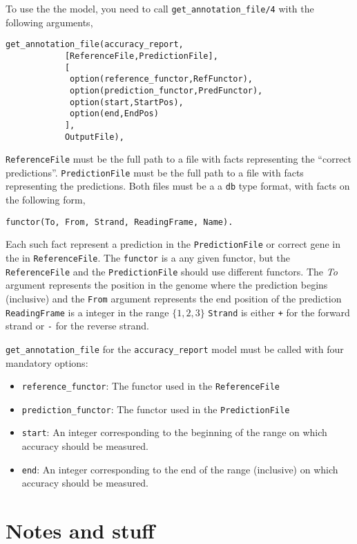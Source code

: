 \documentclass{book}
\begin{document}
To use the the model, you need to call
\texttt{get\_annotation\_file/4} with the following arguments,
\begin{verbatim}
get_annotation_file(accuracy_report,
		    [ReferenceFile,PredictionFile],
		    [
		     option(reference_functor,RefFunctor),
		     option(prediction_functor,PredFunctor),
		     option(start,StartPos),
		     option(end,EndPos)
		    ],
		    OutputFile),
\end{verbatim}

\texttt{ReferenceFile} must be the full path to a file with facts
representing the ``correct predictions''.  
\texttt{PredictionFile} must be the full path to a file with facts
representing the predictions. Both files must be a a \texttt{db} type 
format, with facts on the following form,
\begin{verbatim}
functor(To, From, Strand, ReadingFrame, Name).
\end{verbatim}

Each such fact represent a prediction in the \texttt{PredictionFile} or
correct gene in the in \texttt{ReferenceFile}. 
The \texttt{functor} is a any given functor, but the
\texttt{ReferenceFile} and the \texttt{PredictionFile} should use
different functors. The \emph{To} argument represents the position in
the genome where the prediction begins (inclusive) and the
\texttt{From} argument represents the end position of the prediction
\texttt{ReadingFrame} is a integer in the range $\{1,2,3\}$
\texttt{Strand} is either \texttt{+} for the forward strand or
    \texttt{-} for the reverse strand. 

\texttt{get\_annotation\_file} for the \texttt{accuracy\_report} model
must be called with four mandatory options:
\begin{itemize}
\item \texttt{reference\_functor}: The functor used in the \texttt{ReferenceFile}
\item \texttt{prediction\_functor}: The functor used in the
  \texttt{PredictionFile}
\item \texttt{start}: An integer corresponding to the beginning of the range on which accuracy
  should be measured.
\item \texttt{end}: An integer corresponding to the end of the range
  (inclusive) on which accuracy should be measured.
\end{itemize}


\chapter{Notes and stuff}
\end{document}
